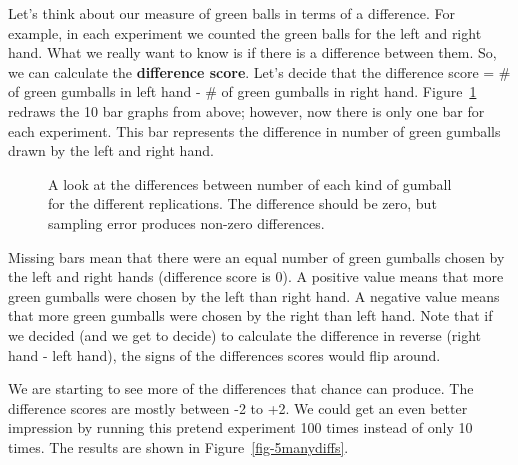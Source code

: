 \documentclass[
  letterpaper,
  DIV=11,
  numbers=noendperiod]{scrreprt}
\begin{document}
Let's think about our measure of green balls in terms of a difference.
For example, in each experiment we counted the green balls for the left
and right hand. What we really want to know is if there is a difference
between them. So, we can calculate the \textbf{difference score}. Let's
decide that the difference score = \# of green gumballs in left hand -
\# of green gumballs in right hand. Figure~\ref{fig-5gumballdiffs}
redraws the 10 bar graphs from above; however, now there is only one bar
for each experiment. This bar represents the difference in number of
green gumballs drawn by the left and right hand.

\begin{figure}


\caption{\label{fig-5gumballdiffs}A look at the differences between
number of each kind of gumball for the different replications. The
difference should be zero, but sampling error produces non-zero
differences.}

\end{figure}%

Missing bars mean that there were an equal number of green gumballs
chosen by the left and right hands (difference score is 0). A positive
value means that more green gumballs were chosen by the left than right
hand. A negative value means that more green gumballs were chosen by the
right than left hand. Note that if we decided (and we get to decide) to
calculate the difference in reverse (right hand - left hand), the signs
of the differences scores would flip around.

We are starting to see more of the differences that chance can produce.
The difference scores are mostly between -2 to +2. We could get an even
better impression by running this pretend experiment 100 times instead
of only 10 times. The results are shown in Figure~\ref{fig-5manydiffs}.
\end{document}
